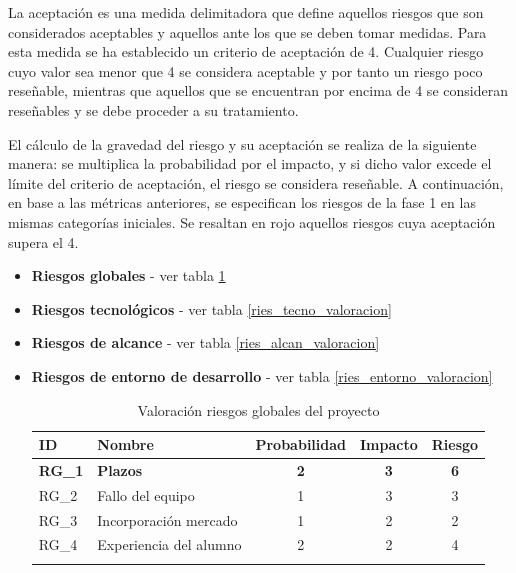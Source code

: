 \begin{enumerate}
\begin{itemize}
\endgroup
\end{itemize}
\par La aceptación es una medida delimitadora que define aquellos riesgos que son considerados aceptables y aquellos ante los que se deben tomar medidas. Para esta medida se ha establecido un criterio de aceptación de 4. Cualquier riesgo cuyo valor sea menor que 4 se considera aceptable y por tanto un riesgo poco reseñable, mientras que aquellos que se encuentran por encima de 4 se consideran reseñables y se debe proceder a su tratamiento. 
\par
El cálculo de la gravedad del riesgo y su aceptación se realiza de la siguiente manera: se multiplica la probabilidad por el impacto, y si dicho valor excede el límite del criterio de aceptación, el riesgo se considera reseñable. 
A continuación, en base a las métricas anteriores, se especifican los riesgos de la fase 1 en las mismas categorías iniciales. Se resaltan en rojo aquellos riesgos cuya aceptación supera el 4.

\begin{itemize}

\item \textbf{Riesgos globales} - ver tabla \ref{ries_glob_valoracion}
\item \textbf{Riesgos tecnológicos} - ver tabla \ref{ries_tecno_valoracion}
\item \textbf{Riesgos de alcance} - ver tabla \ref{ries_alcan_valoracion}
\item \textbf{Riesgos de entorno de desarrollo} - ver tabla \ref{ries_entorno_valoracion}

\bigskip
\begingroup
\renewcommand\arraystretch{1.3}

\begin{longtable}{l p{5cm} ccc}
\hline
\textbf{ID} & \textbf{Nombre} & \textbf{Probabilidad} & \textbf{Impacto} & \textbf{Riesgo} \\
\hline
\endhead
\endfoot
\textbf{RG\_1} & 
\textbf{Plazos} &
\textbf{2} &
\textbf{3} &
\textbf{6} 
 \\
RG\_2 & 
Fallo del equipo &
1 &
3 &
3 
 \\
RG\_3 & 
Incorporación mercado &
1 &
2 &
2 
 \\
RG\_4 & 
Experiencia del alumno &
2 &
2 &
4 
 \\
\hline
\caption{Valoración riesgos globales del proyecto}\label{ries_glob_valoracion}\\
\end{longtable}


\end{itemize}
\end{enumerate}
